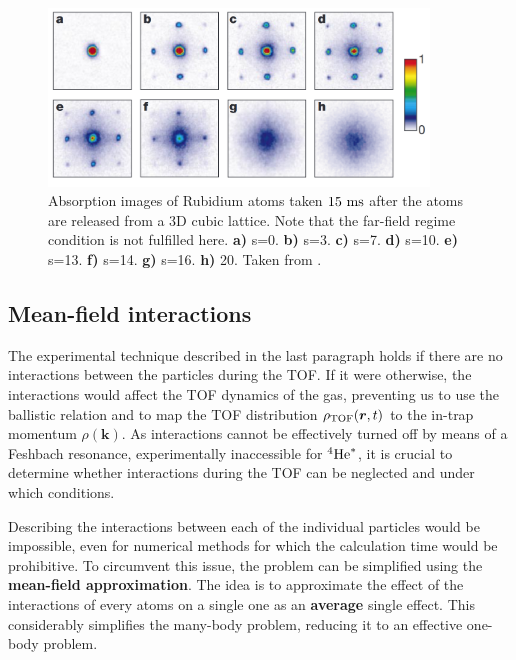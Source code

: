 \begin{figure}
    \centering
    \includegraphics[width=0.9\textwidth]{Fig/Chapter2/mott_greiner.png}
    \caption{Absorption images of Rubidium atoms taken $15 \ \rm{ms}$ after the atoms are released from a 3D cubic lattice. Note that the far-field regime condition is not fulfilled here. \textbf{a)} s=0. \textbf{b)} s=3. \textbf{c)} s=7. \textbf{d)} s=10. \textbf{e)} s=13. \textbf{f)} s=14. \textbf{g)} s=16. \textbf{h)} 20. Taken from \cite{greiner2002quantum}.}
    \label{fig:mott_greiner}
\end{figure}


\subsection{Mean-field interactions}

The experimental technique described in the last paragraph holds if there are no interactions between the particles during the TOF. If it were otherwise, the interactions would affect the TOF dynamics of the gas, preventing us to use the ballistic relation and to map the TOF distribution $\rho_{\rm{TOF}}(\bm{r},t)$ to the in-trap momentum $\rho(\bm{k})$. As interactions cannot be effectively turned off by means of a Feshbach resonance, experimentally inaccessible for $^4 \mathrm{He}^*$, it is crucial to determine whether interactions during the TOF can be neglected and under which conditions.

Describing the interactions between each of the individual particles would be impossible, even for numerical methods for which the calculation time would be prohibitive. To circumvent this issue, the problem can be simplified using the \textbf{mean-field approximation}. The idea is to approximate the effect of the interactions of every atoms on a single one as an \textbf{average} single effect. This considerably simplifies the many-body problem, reducing it to an effective one-body problem.

